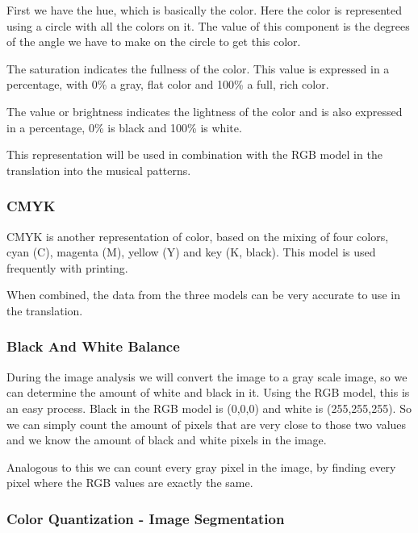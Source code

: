 \documentclass[12pt]{article}
\begin{document}
First we have the hue, which is basically the color. Here the color is represented using a circle with all the colors on it. The value of this component is the degrees of the angle we have to make on the circle to get this color.  
\newline

The saturation indicates the fullness of the color. This value is expressed in a percentage, with 0\% a gray, flat color and 100\%  a full, rich color.
\newline

The value or brightness indicates the lightness of the color and is also expressed in a percentage, 0\% is black and 100\% is white.
\newline

This representation will be used in combination with the RGB model in the translation into the musical patterns.
 
\subsubsection{CMYK}
CMYK is another representation of color, based on the mixing of four colors, cyan (C), magenta (M), yellow (Y) and key (K, black). This model is used frequently with printing.
\newline

When combined, the data from the three models can be very accurate to use in the translation.

\subsubsection{Black And White Balance}
During the image analysis we will convert the image to a gray scale image, so we can determine the amount of white and black in it. Using the RGB model, this is an easy process. Black in the RGB model is (0,0,0) and white is (255,255,255). So we can simply count the amount of pixels that are very close to those two values and we know the amount of black and white pixels in the image.
\newline

Analogous to this we can count every gray pixel in the image, by finding every pixel where the RGB values are exactly the same.

\subsubsection{Color Quantization - Image Segmentation}
\end{document}
